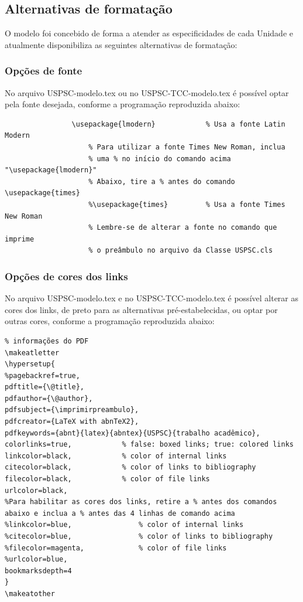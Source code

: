 \subsection{Alternativas de formatação}
O modelo foi concebido de forma a atender as especificidades de cada Unidade e atualmente disponibiliza as seguintes alternativas de formatação:
\subsubsection{Opções de fonte} 
No arquivo USPSC-modelo.tex ou no USPSC-TCC-modelo.tex é possível optar pela fonte desejada, conforme a programação reproduzida abaixo:
				\begin{verbatim}
				\usepackage{lmodern}			% Usa a fonte Latin Modern
					% Para utilizar a fonte Times New Roman, inclua 
					% uma % no início do comando acima  "\usepackage{lmodern}"
					% Abaixo, tire a % antes do comando  \usepackage{times}
					%\usepackage{times}			% Usa a fonte Times New Roman
					% Lembre-se de alterar a fonte no comando que imprime 
					% o preâmbulo no arquivo da Classe USPSC.cls					
				\end{verbatim}
\subsubsection{Opções de cores dos links}\label{coreslinks} 
No arquivo USPSC-modelo.tex e no USPSC-TCC-modelo.tex é possível alterar as cores dos links, de preto para as alternativas pré-estabelecidas, ou optar por outras cores, conforme a programação reproduzida abaixo:
\begin{verbatim}
% informações do PDF
\makeatletter
\hypersetup{
%pagebackref=true,
pdftitle={\@title}, 
pdfauthor={\@author},
pdfsubject={\imprimirpreambulo},
pdfcreator={LaTeX with abnTeX2},
pdfkeywords={abnt}{latex}{abntex}{USPSC}{trabalho acadêmico}, 
colorlinks=true,       		% false: boxed links; true: colored links
linkcolor=black,          	% color of internal links
citecolor=black,        	% color of links to bibliography
filecolor=black,      		% color of file links
urlcolor=black,
%Para habilitar as cores dos links, retire a % antes dos comandos 
abaixo e inclua a % antes das 4 linhas de comando acima 
%linkcolor=blue,            	% color of internal links
%citecolor=blue,        		% color of links to bibliography
%filecolor=magenta,      		% color of file links
%urlcolor=blue,
bookmarksdepth=4	
}
\makeatother				
\end{verbatim}				
